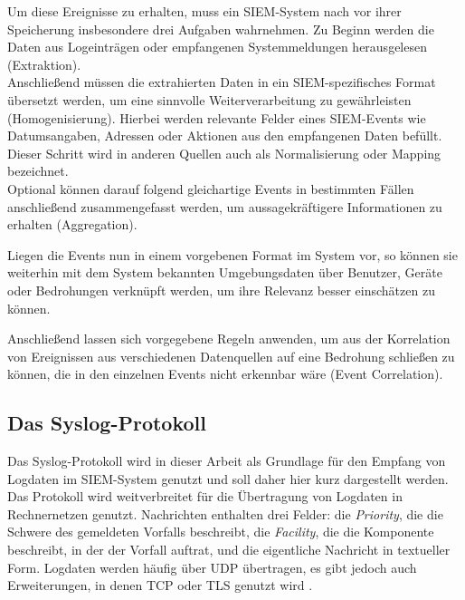 Um diese Ereignisse zu erhalten, muss ein SIEM-System nach \cite{detken2014} vor ihrer Speicherung insbesondere drei Aufgaben wahrnehmen. Zu Beginn werden die Daten aus Logeinträgen oder empfangenen Systemmeldungen herausgelesen (Extraktion).\\
Anschließend müssen die extrahierten Daten in ein SIEM-spezifisches Format übersetzt werden, um eine sinnvolle Weiterverarbeitung zu gewährleisten (Homogenisierung). Hierbei werden relevante Felder eines SIEM-Events wie Datumsangaben, Adressen oder Aktionen aus den empfangenen Daten befüllt. Dieser Schritt wird in anderen Quellen auch als Normalisierung oder Mapping bezeichnet.\\
Optional können darauf folgend gleichartige Events in bestimmten Fällen anschließend zusammengefasst werden, um aussagekräftigere Informationen zu erhalten (Aggregation).

Liegen die Events nun in einem vorgebenen Format im System vor, so können sie weiterhin mit dem System bekannten Umgebungsdaten über Benutzer, Geräte oder Bedrohungen verknüpft werden, um ihre Relevanz besser einschätzen zu können. 

Anschließend lassen sich vorgegebene Regeln anwenden, um aus der Korrelation von Ereignissen aus verschiedenen Datenquellen auf eine Bedrohung schließen zu können, die in den einzelnen Events nicht erkennbar wäre (Event Correlation).

\subsection{Das Syslog-Protokoll}

\label{sec_basics_siem_syslog}

Das Syslog-Protokoll wird in dieser Arbeit als Grundlage für den Empfang von Logdaten im SIEM-System genutzt und soll daher hier kurz dargestellt werden. Das Protokoll wird weitverbreitet für die Übertragung von Logdaten in Rechnernetzen genutzt. Nachrichten enthalten drei Felder: die \textit{Priority}, die die Schwere des gemeldeten Vorfalls beschreibt, die \textit{Facility}, die die Komponente beschreibt, in der der Vorfall auftrat, und die eigentliche Nachricht in textueller Form. Logdaten werden häufig über UDP übertragen, es gibt jedoch auch Erweiterungen, in denen TCP oder TLS genutzt wird \cite{rfc5424}.
